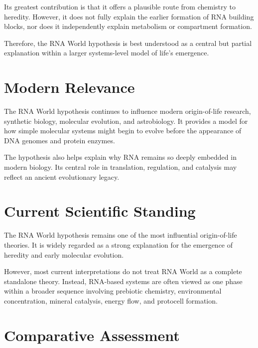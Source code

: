 \documentclass[
  oneside]{book}
\begin{document}
Its greatest contribution is that it offers a plausible route from chemistry to heredity. However, it does not fully explain the earlier formation of RNA building blocks, nor does it independently explain metabolism or compartment formation.

Therefore, the RNA World hypothesis is best understood as a central but partial explanation within a larger systems-level model of life's emergence.

\section{Modern Relevance}\label{modern-relevance-1}

The RNA World hypothesis continues to influence modern origin-of-life research, synthetic biology, molecular evolution, and astrobiology. It provides a model for how simple molecular systems might begin to evolve before the appearance of DNA genomes and protein enzymes.

The hypothesis also helps explain why RNA remains so deeply embedded in modern biology. Its central role in translation, regulation, and catalysis may reflect an ancient evolutionary legacy.

\section{Current Scientific Standing}\label{current-scientific-standing-1}

The RNA World hypothesis remains one of the most influential origin-of-life theories. It is widely regarded as a strong explanation for the emergence of heredity and early molecular evolution.

However, most current interpretations do not treat RNA World as a complete standalone theory. Instead, RNA-based systems are often viewed as one phase within a broader sequence involving prebiotic chemistry, environmental concentration, mineral catalysis, energy flow, and protocell formation.

\section{Comparative Assessment}\label{comparative-assessment-1}
\end{document}
